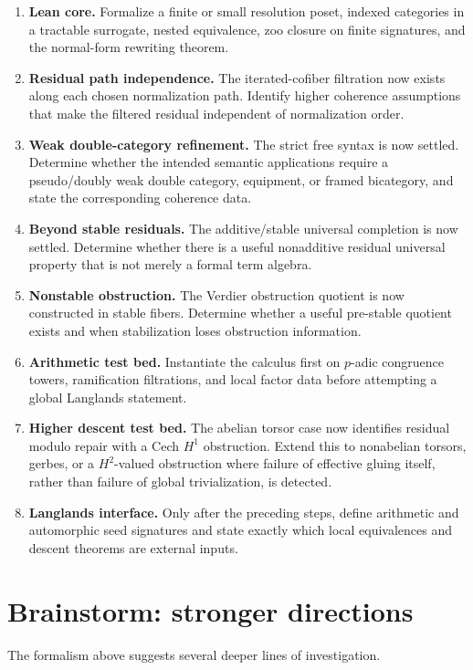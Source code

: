 \documentclass[11pt]{article}
\theoremstyle{definition}
\theoremstyle{remark}
\begin{document}
\begin{enumerate}
    \item \textbf{Lean core.} Formalize a finite or small resolution poset, indexed categories in a tractable surrogate, nested equivalence, zoo closure on finite signatures, and the normal-form rewriting theorem.
    \item \textbf{Residual path independence.} The iterated-cofiber filtration now exists along each chosen normalization path. Identify higher coherence assumptions that make the filtered residual independent of normalization order.
    \item \textbf{Weak double-category refinement.} The strict free syntax is now settled. Determine whether the intended semantic applications require a pseudo/doubly weak double category, equipment, or framed bicategory, and state the corresponding coherence data.
    \item \textbf{Beyond stable residuals.} The additive/stable universal completion is now settled. Determine whether there is a useful nonadditive residual universal property that is not merely a formal term algebra.
    \item \textbf{Nonstable obstruction.} The Verdier obstruction quotient is now constructed in stable fibers. Determine whether a useful pre-stable quotient exists and when stabilization loses obstruction information.
    \item \textbf{Arithmetic test bed.} Instantiate the calculus first on $p$-adic congruence towers, ramification filtrations, and local factor data before attempting a global Langlands statement.
    \item \textbf{Higher descent test bed.} The abelian torsor case now identifies residual modulo repair with a Cech $H^1$ obstruction. Extend this to nonabelian torsors, gerbes, or a $H^2$-valued obstruction where failure of effective gluing itself, rather than failure of global trivialization, is detected.
    \item \textbf{Langlands interface.} Only after the preceding steps, define arithmetic and automorphic seed signatures and state exactly which local equivalences and descent theorems are external inputs.
\end{enumerate}

\section{Brainstorm: stronger directions}

The formalism above suggests several deeper lines of investigation.
\end{document}
